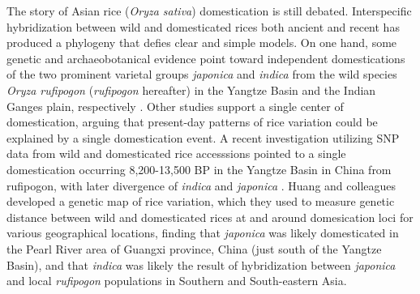 \documentclass[11pt]{article}
\begin{document}
\begin{enumerate}
The story of Asian rice (\emph{Oryza sativa}) domestication is still debated.
Interspecific hybridization between wild and domesticated rices both ancient and recent has produced a phylogeny that defies clear and simple models.
On one hand, some genetic and archaeobotanical evidence point toward independent domestications of the two prominent varietal groups \emph{japonica} and \emph{indica} from the wild species \emph{Oryza rufipogon} (\emph{rufipogon} hereafter) in the Yangtze Basin and the Indian Ganges plain, respectively \cite{fuller2010consilience}.
Other studies support a single center of domestication, arguing that present-day patterns of rice variation could be explained by a single domestication event.
A recent investigation utilizing SNP data from wild and domesticated rice accesssions pointed to a single domestication occurring 8,200-13,500 BP in the Yangtze Basin in China from rufipogon, with later divergence of \emph{indica} and \emph{japonica} \cite{molina2011molecular}.
Huang and colleagues \cite{Huang2012} developed a genetic map of rice variation, which they used to measure genetic distance between wild and domesticated rices at and around domesication loci for various geographical locations, finding that \emph{japonica} was likely domesticated in the Pearl River area of Guangxi province, China (just south of the Yangtze Basin), and that \emph{indica} was likely the result of hybridization between \emph{japonica} and local \emph{rufipogon} populations in Southern and South-eastern Asia. %








\end{enumerate}
\end{document}

